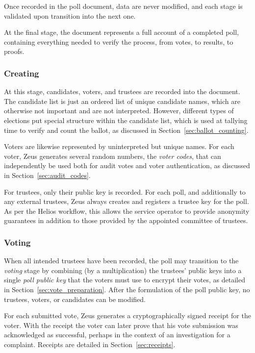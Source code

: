\documentclass[letterpaper,10pt]{article}
\begin{document}
Once recorded in the poll document, data are never modified,
and each stage is validated upon transition into the next one.

At the final stage,
the document represents a full account of a completed poll,
containing everything needed to verify the process,
from votes, to results, to proofs.

\subsubsection{Creating}
At this stage, candidates, voters, and trustees
are recorded into the document.
The candidate list is just an ordered list of unique candidate names,
which are otherwise not important and are not interpreted.
However, different types of elections put special structure
within the candidate list, which is used at tallying time
to verify and count the ballot,
as discussed in Section~\ref{sec:ballot_counting}.

Voters are likewise represented by uninterpreted but unique names.
For each voter,
Zeus generates several random numbers, the \emph{voter codes}, that can
independently be used both for audit votes and voter authentication,
as discussed in Section~\ref{sec:audit_codes}.

For trustees, only their public key is recorded.
For each poll, and additionally to any external trustees,
Zeus always creates and registers a trustee key for the poll.
As per the Helios workflow, this allows the service operator to
provide anonymity guarantees in addition to those provided by
the appointed committee of trustees.

\subsubsection{Voting}
\label{sec:voting}
When all intended trustees have been recorded,
the poll may transition to the \emph{voting} stage
by combining (by a multiplication)
the trustees' public keys into a single \emph{poll public key}
that the voters must use to encrypt their votes,
as detailed in Section~\ref{sec:vote_preparation}.
After the formulation of the poll public key,
no trustees, voters, or candidates can be modified.

For each submitted vote, Zeus generates a cryptographically signed
receipt for the voter.
With the receipt the voter can later prove that
his vote submission was acknowledged as successful,
perhaps in the context of an investigation for a complaint.
Receipts are detailed in Section~\ref{sec:receipts}.
\end{document}

